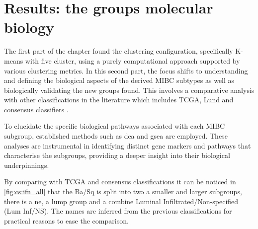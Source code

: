 \section{Results: the groups molecular biology} \label{s:cs:bio_interp}


The first part of the chapter found the clustering configuration, specifically K-means with five cluster, using a purely computational approach supported by various clustering metrics. In this second part, the focus shifts to understanding and defining the biological aspects of the derived MIBC subtypes as well as biologically validating the new groups found. This involves a comparative analysis with other classifications in the literature which includes TCGA, Lund and consensus classifiers \citep{Robertson2017-mg, Marzouka2018-ge,Kamoun2020-tj}.

To elucidate the specific biological pathways associated with each MIBC subgroup, established methods such as \acrfull{dea} and \acrfull{gsea} are employed. These analyses are instrumental in identifying distinct gene markers and pathways that characterise the subgroups, providing a deeper insight into their biological underpinnings.

By comparing with TCGA and consensus classifications \citep{Robertson2017-mg,Kamoun2020-tj} it can be noticed in \cref{fig:cs:ifn_all} that the Ba/Sq is split into two a smaller and larger subgroups, there is a \acrfull{ne}, a \acrfull{lump} group and a combine Luminal Infiltrated/Non-specified (Lum Inf/NS). The names are inferred from the previous classifications for practical reasons to ease the comparison.



